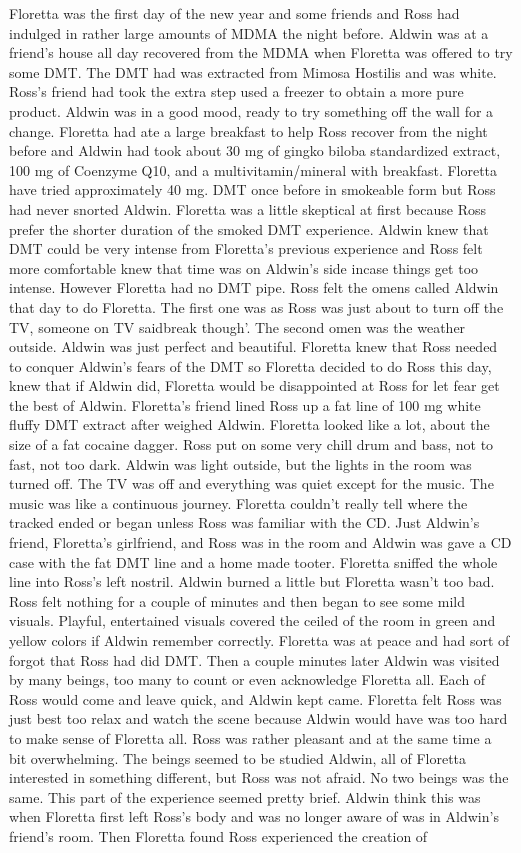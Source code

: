 \documentclass[12pt]{book}
\begin{document}
Floretta was the first day of the new year and some friends and Ross had indulged in rather large amounts of MDMA the night before. Aldwin was at a friend's house all day recovered from the MDMA when Floretta was offered to try some DMT. The DMT had was extracted from Mimosa Hostilis and was white. Ross's friend had took the extra step used a freezer to obtain a more pure product. Aldwin was in a good mood, ready to try something off the wall for a change. Floretta had ate a large breakfast to help Ross recover from the night before and Aldwin had took about 30 mg of gingko biloba standardized extract, 100 mg of Coenzyme Q10, and a multivitamin/mineral with breakfast. Floretta have tried approximately 40 mg. DMT once before in smokeable form but Ross had never snorted Aldwin. Floretta was a little skeptical at first because Ross prefer the shorter duration of the smoked DMT experience. Aldwin knew that DMT could be very intense from Floretta's previous experience and Ross felt more comfortable knew that time was on Aldwin's side incase things get too intense. However Floretta had no DMT pipe. Ross felt the omens called Aldwin that day to do Floretta. The first one was as Ross was just about to turn off the TV, someone on TV saidbreak though'. The second omen was the weather outside. Aldwin was just perfect and beautiful. Floretta knew that Ross needed to conquer Aldwin's fears of the DMT so Floretta decided to do Ross this day, knew that if Aldwin did, Floretta would be disappointed at Ross for let fear get the best of Aldwin. Floretta's friend lined Ross up a fat line of 100 mg white fluffy DMT extract after weighed Aldwin. Floretta looked like a lot, about the size of a fat cocaine dagger. Ross put on some very chill drum and bass, not to fast, not too dark. Aldwin was light outside, but the lights in the room was turned off. The TV was off and everything was quiet except for the music. The music was like a continuous journey. Floretta couldn't really tell where the tracked ended or began unless Ross was familiar with the CD. Just Aldwin's friend, Floretta's girlfriend, and Ross was in the room and Aldwin was gave a CD case with the fat DMT line and a home made tooter. Floretta sniffed the whole line into Ross's left nostril. Aldwin burned a little but Floretta wasn't too bad. Ross felt nothing for a couple of minutes and then began to see some mild visuals. Playful, entertained visuals covered the ceiled of the room in green and yellow colors if Aldwin remember correctly. Floretta was at peace and had sort of forgot that Ross had did DMT. Then a couple minutes later Aldwin was visited by many beings, too many to count or even acknowledge Floretta all. Each of Ross would come and leave quick, and Aldwin kept came. Floretta felt Ross was just best too relax and watch the scene because Aldwin would have was too hard to make sense of Floretta all. Ross was rather pleasant and at the same time a bit overwhelming. The beings seemed to be studied Aldwin, all of Floretta interested in something different, but Ross was not afraid. No two beings was the same. This part of the experience seemed pretty brief. Aldwin think this was when Floretta first left Ross's body and was no longer aware of was in Aldwin's friend's room. Then Floretta found Ross experienced the creation of 
\end{document}

